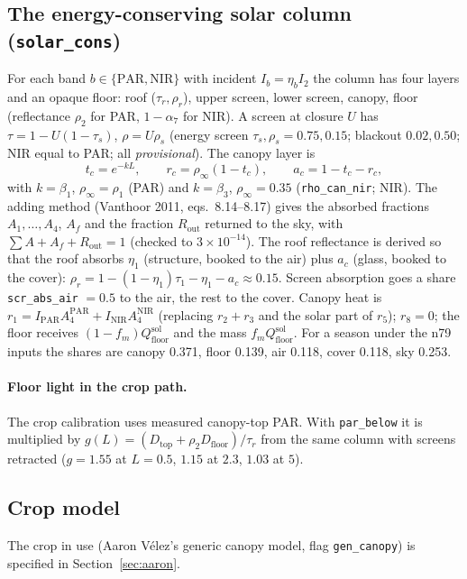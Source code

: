 \documentclass[11pt,a4paper]{article}
\begin{document}
\subsection{The energy-conserving solar column (\texttt{solar\_cons})}\label{sec:column}
For each band $b\in\{\text{PAR},\text{NIR}\}$ with incident $I_b=\eta_bI_2$ the column has four layers and an
opaque floor: roof ($\tau_r,\rho_r$), upper screen, lower screen, canopy, floor (reflectance $\rho_2$ for PAR,
$1-\alpha_7$ for NIR). A screen at closure $U$ has $\tau=1-U(1-\tau_s)$, $\rho=U\rho_s$ (energy screen
$\tau_s,\rho_s=0.75,0.15$; blackout $0.02,0.50$; NIR equal to PAR; all \emph{provisional}). The canopy layer
is
\begin{equation}
t_c=e^{-kL},\qquad r_c=\rho_\infty(1-t_c),\qquad a_c=1-t_c-r_c,
\end{equation}
with $k=\beta_1$, $\rho_\infty=\rho_1$ (PAR) and $k=\beta_3$, $\rho_\infty=0.35$ (\texttt{rho\_can\_nir}; NIR).
The adding method (Vanthoor 2011, eqs.~8.14--8.17) gives the absorbed fractions $A_1,\dots,A_4$, $A_f$ and the
fraction $R_{\text{out}}$ returned to the sky, with $\sum A+A_f+R_{\text{out}}=1$ (checked to $3\times10^{-14}$).
The roof reflectance is derived so that the roof absorbs $\eta_1$ (structure, booked to the air) plus
$a_c$ (glass, booked to the cover): $\rho_r=1-(1-\eta_1)\tau_1-\eta_1-a_c\approx0.15$. Screen absorption goes
a share \texttt{scr\_abs\_air} $=0.5$ to the air, the rest to the cover. Canopy heat is
$r_1=I_{\text{PAR}}A_4^{\text{PAR}}+I_{\text{NIR}}A_4^{\text{NIR}}$ (replacing $r_2+r_3$ and the solar part of
$r_5$); $r_8=0$; the floor receives $(1-f_m)Q_{\text{floor}}^{\text{sol}}$ and the mass $f_mQ_{\text{floor}}^{\text{sol}}$.
For a season under the n79 inputs the shares are canopy 0.371, floor 0.139, air 0.118, cover 0.118, sky 0.253.

\paragraph{Floor light in the crop path.} The crop calibration uses measured canopy-top PAR. With
\texttt{par\_below} it is multiplied by $g(L)=(D_{\text{top}}+\rho_2D_{\text{floor}})/\tau_r$ from the same column
with screens retracted ($g=1.55$ at $L=0.5$, $1.15$ at $2.3$, $1.03$ at $5$).

\subsection{Crop model}
The crop in use (Aaron V\'elez's generic canopy model, flag \texttt{gen\_canopy}) is specified in Section~\ref{sec:aaron}.
\end{document}
